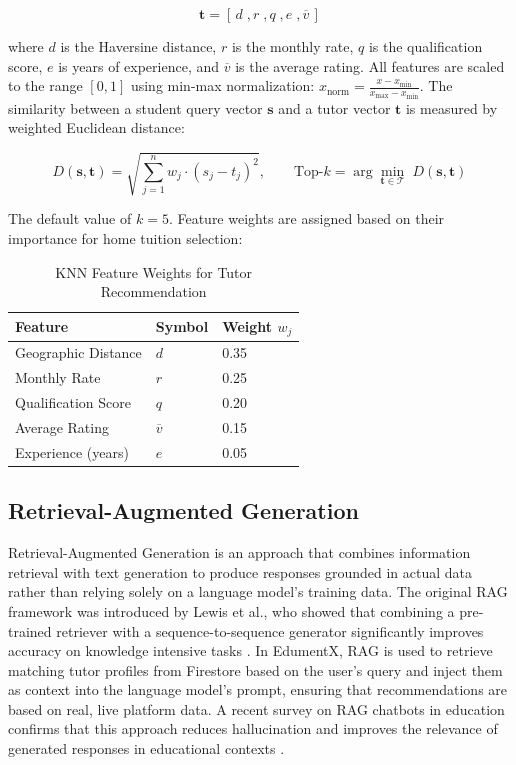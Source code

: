 \documentclass[12pt]{report}
\begin{document}
\begin{equation}
\mathbf{t} = [\,d\;, r\;, q\;, e\;, \overline{v}\,]
\end{equation}

\noindent where $d$ is the Haversine distance, $r$ is the
monthly rate, $q$ is the qualification score, $e$ is years of
experience, and $\overline{v}$ is the average rating. All
features are scaled to the range $[0, 1]$ using min-max
normalization: $x_{\text{norm}} = \frac{x - x_{\min}}{x_{\max} -
x_{\min}}$. The similarity between a student query vector
$\mathbf{s}$ and a tutor vector $\mathbf{t}$ is measured by
weighted Euclidean distance:

\begin{equation}
D(\mathbf{s}, \mathbf{t}) =
\sqrt{\sum_{j=1}^{n} w_j \cdot \left(s_j - t_j\right)^2},
\qquad \text{Top-}k = \arg\min_{\mathbf{t} \in \mathcal{T}}\;
D(\mathbf{s}, \mathbf{t})
\end{equation}

\noindent The default value of $k = 5$. Feature weights are
assigned based on their importance for home tuition selection:

\begin{table}[H]
\centering
\caption{KNN Feature Weights for Tutor Recommendation}
\vspace{5pt}
\begin{tabular}{|l|l|l|}
\hline
Feature & Symbol & Weight $w_j$ \\
\hline
Geographic Distance & $d$ & 0.35 \\
Monthly Rate        & $r$ & 0.25 \\
Qualification Score & $q$ & 0.20 \\
Average Rating      & $\overline{v}$ & 0.15 \\
Experience (years)  & $e$ & 0.05 \\
\hline
\end{tabular}
\end{table}

\subsection{Retrieval-Augmented Generation}

Retrieval-Augmented Generation is an approach that combines
information retrieval with text generation to produce responses
grounded in actual data rather than relying solely on a
language model's training data. The original RAG framework was
introduced by Lewis et al., who showed that combining a
pre-trained retriever with a sequence-to-sequence generator
significantly improves accuracy on knowledge intensive tasks
\citep{Lewis2021RAG}. In EdumentX, RAG is used to retrieve
matching tutor profiles from Firestore based on the user's
query and inject them as context into the language model's
prompt, ensuring that recommendations are based on real, live
platform data. A recent survey on RAG chatbots in education
confirms that this approach reduces hallucination and improves
the relevance of generated responses in educational contexts
\citep{Swacha2025RAG}.
\end{document}
